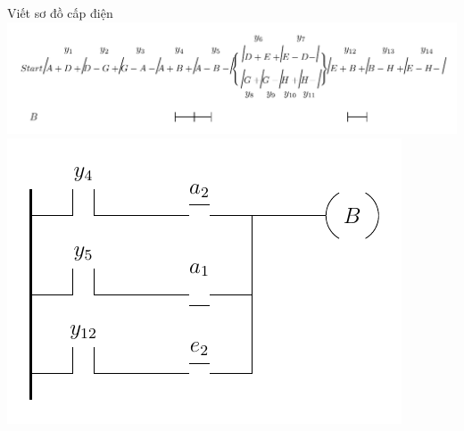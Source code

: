 \documentclass[24pt]{beamer}
\begin{document}
\begin{frame}[plain]{Viết sơ đồ cấp điện}
		\vspace{-0.5cm}
		\hspace{-1cm}\includegraphics[scale=0.7]{draw-tikz/quatrinh-bt4-buoc3-sodocapdien-B-b1.pdf}\\
		\vspace{-.7cm}
		\includegraphics[scale=1.1]{draw-tikz/quatrinh-bt4-buoc3-sodocapdien-B-b2.pdf}
\end{frame}
\end{document}
